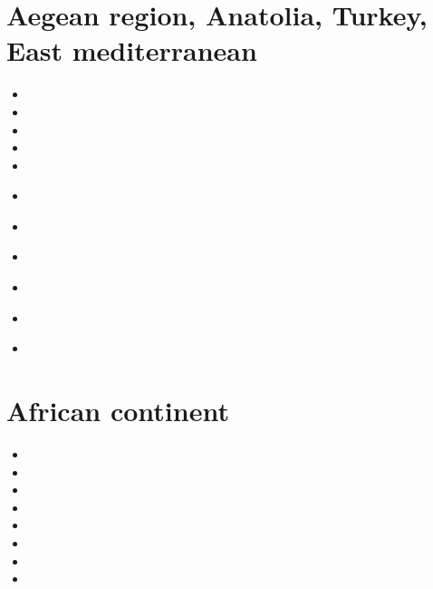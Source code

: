 
\section{Aegean region, Anatolia, Turkey, East mediterranean}

\begin{small}
\begin{itemize}
\item[\nineteenseventyeight] 
\item[\nineteenninetynine] 
\item[\twothousandthree] 
\item[\twothousandten] 
\item[\twothousandeleven] 
\item[\twothousandthirteen] 
\\ 
\item[\twothousandseventeen] 
\item[\twothousandtwenty] 
 \\
\item[\twothousandtwentyone] 
 \\
\item[\twothousandtwentythree]
\item[\twothousandtwentyfour]
 \\
\end{itemize}
\end{small}

\section{African continent}

\begin{small}
\begin{itemize}
\item[\nineteenninetyfour]
\item[\nineteenninetynine]
\item[\twothousandeleven]
\item[\twothousandtwelve]
\item[\twothousandfourteen]
\item[\twothousandseventeen]
\item[\twothousandeighteen]
\item[\twothousandtwenty]
\end{itemize}
\end{small}

